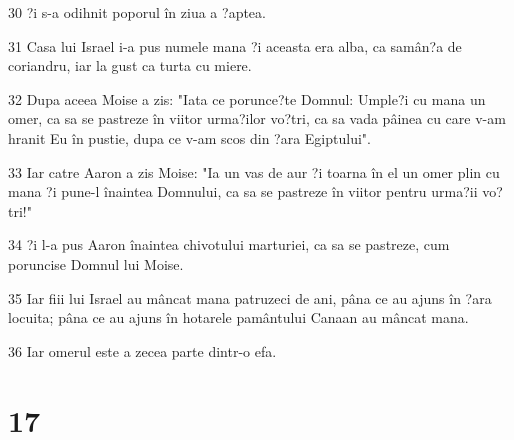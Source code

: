 \par 30 ?i s-a odihnit poporul în ziua a ?aptea.
\par 31 Casa lui Israel i-a pus numele mana ?i aceasta era alba, ca samân?a de coriandru, iar la gust ca turta cu miere.
\par 32 Dupa aceea Moise a zis: "Iata ce porunce?te Domnul: Umple?i cu mana un omer, ca sa se pastreze în viitor urma?ilor vo?tri, ca sa vada pâinea cu care v-am hranit Eu în pustie, dupa ce v-am scos din ?ara Egiptului".
\par 33 Iar catre Aaron a zis Moise: "Ia un vas de aur ?i toarna în el un omer plin cu mana ?i pune-l înaintea Domnului, ca sa se pastreze în viitor pentru urma?ii vo?tri!"
\par 34 ?i l-a pus Aaron înaintea chivotului marturiei, ca sa se pastreze, cum poruncise Domnul lui Moise.
\par 35 Iar fiii lui Israel au mâncat mana patruzeci de ani, pâna ce au ajuns în ?ara locuita; pâna ce au ajuns în hotarele pamântului Canaan au mâncat mana.
\par 36 Iar omerul este a zecea parte dintr-o efa.

\chapter{17}

